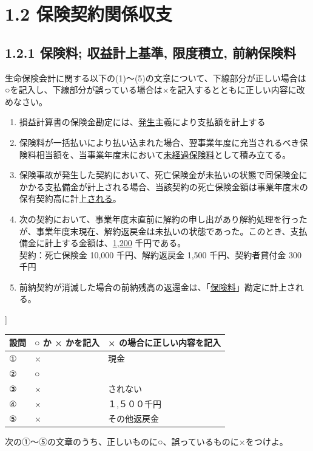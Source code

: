 \documentclass[report,gutter=10mm,fore-edge=10mm,uplatex,dvipdfmx]{jlreq}
\begin{document}
\section{1.2 保険契約関係収支} 
\subsection{1.2.1 保険料;  収益計上基準, 限度積立, 前納保険料}

生命保険会計に関する以下の(1)～(5)の文章について、下線部分が正しい場合は○を記入し、下線部分が誤っている場合は×を記入するとともに正しい内容に改めなさい。

\begin{enumerate} [(1)]
 \item  損益計算書の保険金勘定には、\underline{発生}主義により支払額を計上する
 \item  保険料が一括払いにより払い込まれた場合、翌事業年度に充当されるべき保険料相当額を、当事業年度末において\underline{未経過保険料}として積み立てる。
 \item  保険事故が発生した契約において、死亡保険金が未払いの状態で同保険金にかかる支払備金が計上される場合、当該契約の死亡保険金額は事業年度末の保有契約高に計上\underline{される}。
 \item 
 次の契約において、事業年度末直前に解約の申し出があり解約処理を行ったが、事業年度末現在、解約返戻金は未払いの状態であった。このとき、支払備金に計上する金額は、\underline{1,200} 千円である。\\ 
       契約：死亡保険金 10,000 千円、解約返戻金 1,500 千円、契約者貸付金 300 千円
 \item  前納契約が消滅した場合の前納残高の返還金は、「\underline{保険料}」勘定に計上される。
\end{enumerate}
]


\begin{longtable}[]{@{}lll@{}}
\toprule
設問 & ○ か × かを記入 & × の場合に正しい内容を記入\tabularnewline
\midrule
\endhead
① & × & 現金\tabularnewline
② & ○ &\tabularnewline
③ & × & されない\tabularnewline
④ & × & １,５００千円\tabularnewline
⑤ & × & その他返戻金\tabularnewline
\bottomrule
\end{longtable}


次の①～⑤の文章のうち、正しいものに○、誤っているものに×をつけよ。
\end{document}
